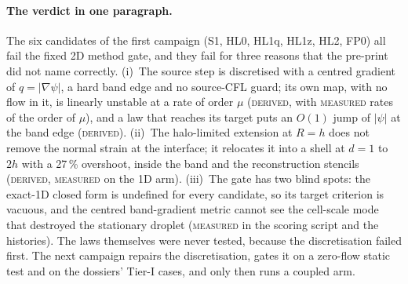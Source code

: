 \documentclass[11pt,a4paper]{article}
\newcommand{\Meas}{\textsc{measured}}
\newcommand{\Der}{\textsc{derived}}
\begin{document}
\paragraph{The verdict in one paragraph.} The six candidates of the first campaign (S1, HL0,
HL1q, HL1z, HL2, FP0) all fail the fixed 2D method gate, and they fail for three reasons that
the pre-print did not name correctly. (i)~The source step is discretised with a centred
gradient of $q=|\nabla\psi|$, a hard band edge and no source-CFL guard; its own map, with no
flow in it, is linearly unstable at a rate of order $\mu$ (\Der, with \Meas{} rates of the
order of $\mu$), and a law that reaches its target puts an $O(1)$ jump of $|\psi|$ at the band
edge (\Der). (ii)~The halo-limited extension at $R=h$ does not remove the normal strain at the
interface; it relocates it into a shell at $d=1$ to $2h$ with a 27\,\% overshoot, inside the
band and the reconstruction stencils (\Der, \Meas{} on the 1D arm). (iii)~The gate has two blind
spots: the exact-1D closed form is undefined for every candidate, so its target criterion is
vacuous, and the centred band-gradient metric cannot see the cell-scale mode that destroyed the
stationary droplet (\Meas{} in the scoring script and the histories). The laws themselves were
never tested, because the discretisation failed first. The next campaign repairs the
discretisation, gates it on a zero-flow static test and on the dossiers' Tier-I cases, and
only then runs a coupled arm.
\end{document}
